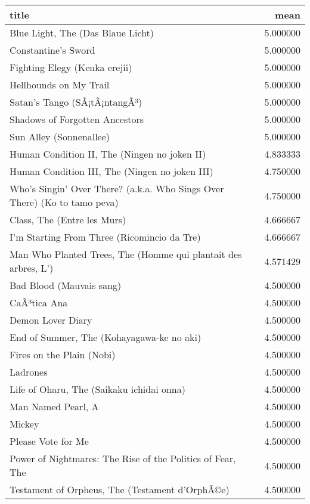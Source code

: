 \documentclass[]{article}
\begin{document}
\begin{table}[H]
\centering\begingroup\fontsize{10}{12}\selectfont

\begin{tabular}{l|r}
\hline
title & mean\\
\hline
Blue Light, The (Das Blaue Licht) & 5.000000\\
\hline
Constantine's Sword & 5.000000\\
\hline
Fighting Elegy (Kenka erejii) & 5.000000\\
\hline
Hellhounds on My Trail & 5.000000\\
\hline
Satan's Tango (SÃ¡tÃ¡ntangÃ³) & 5.000000\\
\hline
Shadows of Forgotten Ancestors & 5.000000\\
\hline
Sun Alley (Sonnenallee) & 5.000000\\
\hline
Human Condition II, The (Ningen no joken II) & 4.833333\\
\hline
Human Condition III, The (Ningen no joken III) & 4.750000\\
\hline
Who's Singin' Over There? (a.k.a. Who Sings Over There) (Ko to tamo peva) & 4.750000\\
\hline
Class, The (Entre les Murs) & 4.666667\\
\hline
I'm Starting From Three (Ricomincio da Tre) & 4.666667\\
\hline
Man Who Planted Trees, The (Homme qui plantait des arbres, L') & 4.571429\\
\hline
Bad Blood (Mauvais sang) & 4.500000\\
\hline
CaÃ³tica Ana & 4.500000\\
\hline
Demon Lover Diary & 4.500000\\
\hline
End of Summer, The (Kohayagawa-ke no aki) & 4.500000\\
\hline
Fires on the Plain (Nobi) & 4.500000\\
\hline
Ladrones & 4.500000\\
\hline
Life of Oharu, The (Saikaku ichidai onna) & 4.500000\\
\hline
Man Named Pearl, A & 4.500000\\
\hline
Mickey & 4.500000\\
\hline
Please Vote for Me & 4.500000\\
\hline
Power of Nightmares: The Rise of the Politics of Fear, The & 4.500000\\
\hline
Testament of Orpheus, The (Testament d'OrphÃ©e) & 4.500000\\
\hline
\end{tabular}
\endgroup{}
\end{table}
\end{document}

